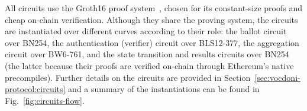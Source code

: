 All \davinci circuits use the Groth16 proof system~\cite{groth2016size}, chosen for its constant-size proofs and cheap on-chain verification. Although they share the proving system, the circuits are instantiated over different curves according to their role: the ballot circuit over BN254, the authentication (verifier) circuit over BLS12-377, the aggregation circuit over BW6-761, and the state transition and results circuits over BN254 (the latter because their proofs are verified on-chain through Ethereum's native precompiles). Further details on the circuits are provided in Section~\ref{sec:vocdoni-protocol:circuits} and a summary of the instantiations can be found in Fig.~\ref{fig:circuits-flow}.
